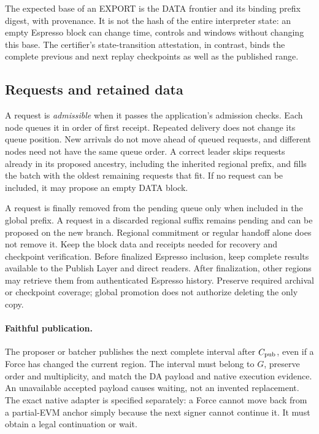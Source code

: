 \documentclass[11pt,a4paper]{article}
\newcommand{\defterm}[1]{\textcolor{rrBlue}{\textit{#1}}}
\begin{document}
The expected base of an EXPORT is the DATA frontier and its binding
prefix digest, with provenance. It is not the hash of the entire
interpreter state: an empty Espresso block can change time, controls
and windows without changing this base. The certifier's state-transition
attestation, in contrast, binds the complete previous and next replay
checkpoints as well as the published range.

\subsection{Requests and retained data}
\label{sec:requests}
A request is \defterm{admissible} when it passes the application's admission
checks. Each node queues it in order of first receipt. Repeated delivery
does not change its queue position. New arrivals do not move
ahead of queued requests, and different nodes need not have the same
queue order. A correct leader skips requests
already in its proposed ancestry, including the inherited regional
prefix, and fills the batch with the oldest remaining requests that fit.
If no request can be included, it may propose an empty DATA block.

A request is finally removed from the pending queue only when included
in the global prefix. A request in a discarded regional suffix remains
pending and can be proposed on the new branch. Regional commitment or
regular handoff alone does not remove it. Keep the block data and
receipts needed for recovery and checkpoint verification. Before finalized Espresso
inclusion, keep complete results available to the Publish Layer and
direct readers. After finalization, other regions may retrieve them from
authenticated Espresso history. Preserve required archival or checkpoint
coverage; global promotion does not authorize deleting the only copy.



\paragraph{Faithful publication.}
The proposer or batcher publishes the next complete interval after
$C_{\rm pub}$, even if a Force has changed the current region.
The interval must belong to $G$, preserve order and multiplicity, and
match the DA payload and native execution evidence. An unavailable
accepted payload causes waiting, not an invented replacement.
The exact native adapter is specified separately: a Force cannot move
back from a partial-EVM anchor simply because the next signer cannot
continue it. It must obtain a legal continuation or wait.
\end{document}
